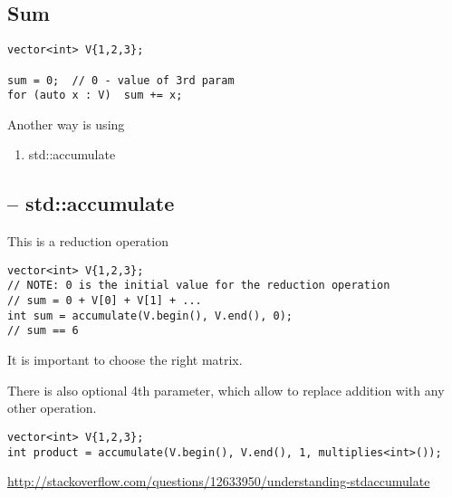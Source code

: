 \subsection{Sum}

\begin{verbatim}
vector<int> V{1,2,3};  

sum = 0;  // 0 - value of 3rd param
for (auto x : V)  sum += x;
\end{verbatim}

Another way is using 
\begin{enumerate}
  \item std::accumulate
\end{enumerate}

\subsection{-- std::accumulate}
\label{sec:std::accumulate}

This is a reduction operation
\begin{verbatim}
vector<int> V{1,2,3};  
// NOTE: 0 is the initial value for the reduction operation
// sum = 0 + V[0] + V[1] + ...
int sum = accumulate(V.begin(), V.end(), 0);
// sum == 6
\end{verbatim}
It is important to choose the right matrix.

There is also optional 4th parameter, which allow to replace addition with any
other operation.

\begin{verbatim}
vector<int> V{1,2,3};
int product = accumulate(V.begin(), V.end(), 1, multiplies<int>());
\end{verbatim}

\url{http://stackoverflow.com/questions/12633950/understanding-stdaccumulate}